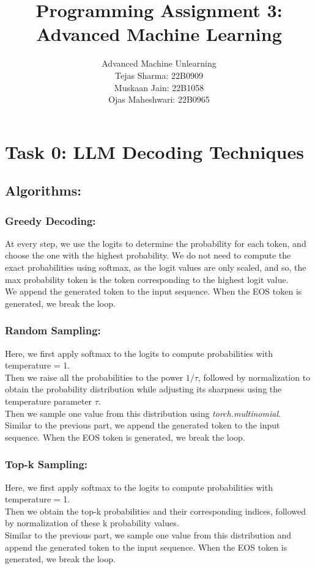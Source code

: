 \documentclass{article}
\title{Programming Assignment 3: Advanced Machine Learning}
\author{
    Advanced Machine Unlearning \\
    Tejas Sharma: 22B0909 \\
    Muskaan Jain: 22B1058 \\
    Ojas Maheshwari: 22B0965
}
\date{}
\begin{document}
\maketitle
\tableofcontents
\clearpage


\section{Task 0: LLM Decoding Techniques}

\subsection{Algorithms:}

\subsubsection{Greedy Decoding:} At every step, we use the logits to determine the probability for each token, and choose the one with the highest probability. We do not need to compute the exact probabilities using softmax, as the logit values are only scaled, and so, the max probability token is the token corresponding to the highest logit value.\\
We append the generated token to the input sequence. When the EOS token is generated, we break the loop.

\subsubsection{Random Sampling:}
Here, we first apply softmax to the logits to compute probabilities with temperature = 1. \\
Then we raise all the probabilities to the power $1/\tau$, followed by normalization to obtain the probability distribution while adjusting its sharpness using the temperature parameter $\tau$. \\
Then we sample one value from this distribution using \textit{torch.multinomial}. \\
Similar to the previous part, we append the generated token to the input sequence. When the EOS token is generated, we break the loop.

\subsubsection{Top-k Sampling:}
Here, we first apply softmax to the logits to compute probabilities with temperature = 1. \\
Then we obtain the top-k probabilities and their corresponding indices, followed by normalization of these k probability values.\\
Similar to the previous part, we sample one value from this distribution and append the generated token to the input sequence. When the EOS token is generated, we break the loop.
\end{document}
